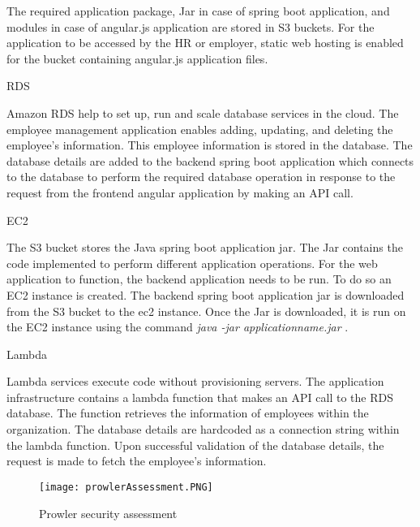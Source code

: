 \par The required application package, Jar in case of spring boot application, and modules in case of angular.js application are stored in S3 buckets.
For the application to be accessed by the HR or employer,
static web hosting is enabled for the bucket containing angular.js application files.


\hfill \break

\par RDS

\par Amazon RDS help to set up, run and scale database services in the cloud.
The employee management application enables adding, updating, and deleting the employee’s information.
This employee information is stored in the database.
The database details are added to the backend spring boot application which connects to the database to perform the required database operation in response to the request from the frontend angular application by making an API call.

\hfill \break
\par EC2

\par The S3 bucket stores the Java spring boot application jar.
The Jar contains the code implemented to perform different application operations.
For the web application to function, the backend application needs to be run.
To do so an EC2 instance is created.
The backend spring boot application jar is downloaded from the S3 bucket to the ec2 instance.
Once the Jar is downloaded, it is run on the EC2 instance
using the command \textit{java -jar applicationname.jar} 
\cite{78}.

\hfill \break
\par Lambda

\par Lambda services execute code without provisioning servers.
The application infrastructure contains a lambda function that makes an API call to the RDS database.
The function retrieves the information of employees within the organization.
The database details are hardcoded as a connection string within the lambda function.
Upon successful validation of the database details, the request is made to fetch the employee’s information.
\begin{figure}
    \centering
    \texttt{[image: prowlerAssessment.PNG]}
    \caption{Prowler security assessment}
    \label{fig:prowlerassessmentreport}
\end{figure}


